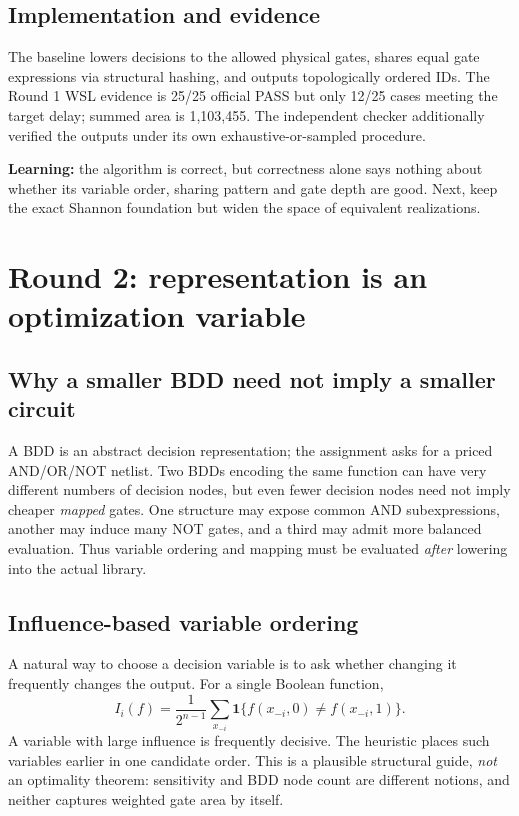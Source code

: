 \documentclass[a4paper,10pt]{article}
\theoremstyle{definition}
\theoremstyle{remark}
\begin{document}
\subsection{Implementation and evidence}
The baseline lowers decisions to the allowed physical gates, shares equal gate expressions via structural hashing, and outputs topologically ordered IDs. The Round 1 WSL evidence is 25/25 official PASS but only 12/25 cases meeting the target delay; summed area is 1,103,455. The independent checker additionally verified the outputs under its own exhaustive-or-sampled procedure.

\begin{tcolorbox}[colback=ResearchPeach!35,colframe=ResearchRose,title=Decision after Round 1]
\textbf{Learning:} the algorithm is correct, but correctness alone says nothing about whether its variable order, sharing pattern and gate depth are good. Next, keep the exact Shannon foundation but widen the space of equivalent realizations.
\end{tcolorbox}

\section{Round 2: representation is an optimization variable}
\subsection{Why a smaller BDD need not imply a smaller circuit}
A BDD is an abstract decision representation; the assignment asks for a priced AND/OR/NOT netlist. Two BDDs encoding the same function can have very different numbers of decision nodes, but even fewer decision nodes need not imply cheaper \emph{mapped} gates. One structure may expose common AND subexpressions, another may induce many NOT gates, and a third may admit more balanced evaluation. Thus variable ordering and mapping must be evaluated \emph{after} lowering into the actual library.

\subsection{Influence-based variable ordering}
A natural way to choose a decision variable is to ask whether changing it frequently changes the output. For a single Boolean function,
\begin{equation}
 I_i(f)=\frac{1}{2^{n-1}}\sum_{x_{-i}}\mathbf1\{f(x_{-i},0)\ne f(x_{-i},1)\}.
\end{equation}
A variable with large influence is frequently decisive. The heuristic places such variables earlier in one candidate order. This is a plausible structural guide, \emph{not} an optimality theorem: sensitivity and BDD node count are different notions, and neither captures weighted gate area by itself.
\end{document}
